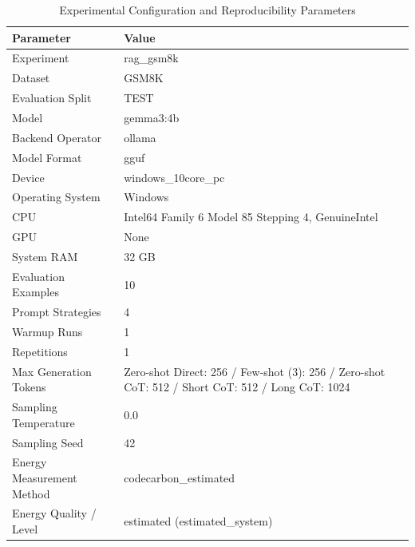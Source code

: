 \begin{table}
\caption{Experimental Configuration and Reproducibility Parameters}
\label{tab:experimental_configuration}
\begin{tabular}{ll}
\toprule
Parameter & Value \\
\midrule
Experiment & rag\_gsm8k \\
Dataset & GSM8K \\
Evaluation Split & TEST \\
Model & gemma3:4b \\
Backend Operator & ollama \\
Model Format & gguf \\
Device & windows\_10core\_pc \\
Operating System & Windows \\
CPU & Intel64 Family 6 Model 85 Stepping 4, GenuineIntel \\
GPU & None \\
System RAM & 32 GB \\
Evaluation Examples & 10 \\
Prompt Strategies & 4 \\
Warmup Runs & 1 \\
Repetitions & 1 \\
Max Generation Tokens & Zero-shot Direct: 256 / Few-shot (3): 256 / Zero-shot CoT: 512 / Short CoT: 512 / Long CoT: 1024 \\
Sampling Temperature & 0.0 \\
Sampling Seed & 42 \\
Energy Measurement Method & codecarbon\_estimated \\
Energy Quality / Level & estimated (estimated\_system) \\
\bottomrule
\end{tabular}
\end{table}
